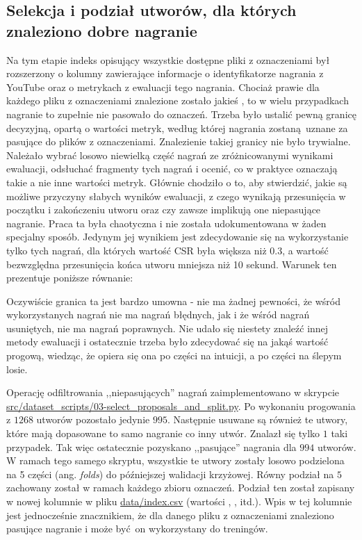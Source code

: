 \subsection{Selekcja i podział utworów, dla których znaleziono dobre nagranie}
Na tym etapie indeks opisujący wszystkie dostępne pliki z oznaczeniami był rozszerzony o kolumny
zawierające informacje o identyfikatorze nagrania z YouTube oraz o metrykach z ewaluacji tego
nagrania. Chociaż prawie dla każdego pliku z oznaczeniami znalezione zostało jakieś
, to w wielu przypadkach nagranie to zupełnie nie pasowało do oznaczeń. Trzeba było
ustalić pewną granicę decyzyjną, opartą o wartości metryk, według której nagrania zostaną uznane za
pasujące do plików z oznaczeniami. Znalezienie takiej granicy nie było trywialne. Należało wybrać
losowo niewielką część nagrań ze zróżnicowanymi wynikami ewaluacji, odsłuchać fragmenty tych nagrań
i ocenić, co w praktyce oznaczają takie a nie inne wartości metryk. Głównie chodziło o to, aby
stwierdzić, jakie są możliwe przyczyny słabych wyników ewaluacji, z czego wynikają przesunięcia w
początku i zakończeniu utworu oraz czy zawsze implikują one niepasujące nagranie. Praca ta była
chaotyczna i nie została udokumentowana w żaden specjalny sposób. Jedynym jej wynikiem jest
zdecydowanie się na wykorzystanie tylko tych nagrań, dla których wartość CSR była większa niż
0.3, a wartość bezwzględna przesunięcia końca utworu mniejsza niż 10 sekund. Warunek ten prezentuje
poniższe równanie:
\begin{center}
\end{center}
Oczywiście granica ta jest bardzo umowna - nie ma żadnej pewności, że wśród wykorzystanych nagrań
nie ma nagrań błędnych, jak i że wśród nagrań usuniętych, nie ma nagrań poprawnych. Nie udało się
niestety znaleźć innej metody ewaluacji i ostatecznie trzeba było zdecydować się na jakąś wartość
progową, wiedząc, że opiera się ona po części na intuicji, a po części na ślepym losie.

Operację odfiltrowania ,,niepasujących'' nagrań zaimplementowano w skrypcie
\url{src/dataset_scripts/03-select_proposals_and_split.py}. Po wykonaniu progowania z $1268$ utworów
pozostało jedynie $995$. Następnie usuwane są również te utwory, które mają dopasowane to samo
nagranie co inny utwór. Znalazł się tylko $1$ taki przypadek. Tak więc ostatecznie pozyskano
,,pasujące'' nagrania dla $994$ utworów. W ramach tego samego skryptu, wszystkie te utwory zostały
losowo podzielona na 5 części (ang. \emph{folds}) do późniejszej walidacji krzyżowej. Równy podział
na $5$ zachowany został w ramach każdego zbioru oznaczeń. Podział ten został zapisany w nowej
kolumnie  w pliku \url{data/index.csv} (wartości ,
, itd.). Wpis w tej kolumnie jest jednocześnie znacznikiem, że dla danego pliku z
oznaczeniami znaleziono pasujące nagranie i może być on wykorzystany do treningów.

